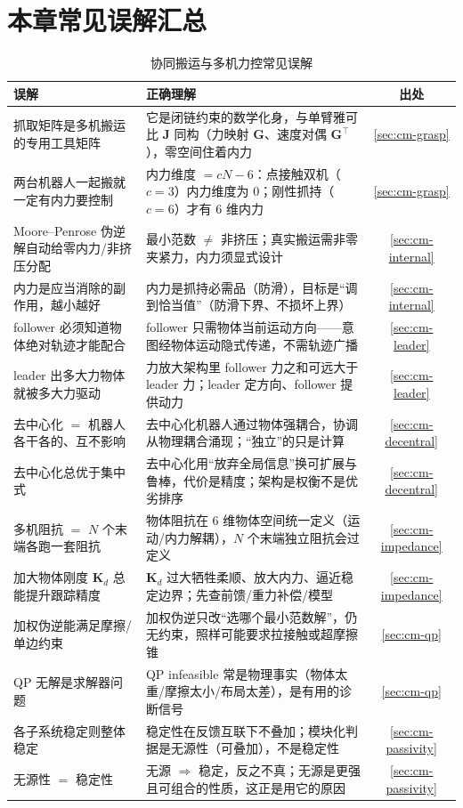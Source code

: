 \section*{本章常见误解汇总}

\begin{table}[H]\centering\small
\caption{协同搬运与多机力控常见误解}
\label{tab:cm-misconceptions}
\begin{tabular}{p{4.6cm}p{6.8cm}c}
\toprule
误解 & 正确理解 & 出处 \\
\midrule
抓取矩阵是多机搬运的专用工具矩阵 & 它是闭链约束的数学化身，与单臂雅可比 $\mathbf{J}$ 同构（力映射 $\mathbf{G}$、速度对偶 $\mathbf{G}^\top$），零空间住着内力 & \cref{sec:cm-grasp} \\
两台机器人一起搬就一定有内力要控制 & 内力维度 $=cN-6$：点接触双机（$c{=}3$）内力维度为 $0$；刚性抓持（$c{=}6$）才有 $6$ 维内力 & \cref{sec:cm-grasp} \\
Moore--Penrose 伪逆解自动给零内力/非挤压分配 & 最小范数 $\ne$ 非挤压；真实搬运需非零夹紧力，内力须显式设计 & \cref{sec:cm-internal} \\
内力是应当消除的副作用，越小越好 & 内力是抓持必需品（防滑），目标是“调到恰当值”（防滑下界、不损坏上界） & \cref{sec:cm-internal} \\
follower 必须知道物体绝对轨迹才能配合 & follower 只需物体当前运动方向——意图经物体运动隐式传递，不需轨迹广播 & \cref{sec:cm-leader} \\
leader 出多大力物体就被多大力驱动 & 力放大架构里 follower 力之和可远大于 leader 力；leader 定方向、follower 提供动力 & \cref{sec:cm-leader} \\
去中心化 $=$ 机器人各干各的、互不影响 & 去中心化机器人通过物体强耦合，协调从物理耦合涌现；“独立”的只是计算 & \cref{sec:cm-decentral} \\
去中心化总优于集中式 & 去中心化用“放弃全局信息”换可扩展与鲁棒，代价是精度；架构是权衡不是优劣排序 & \cref{sec:cm-decentral} \\
多机阻抗 $=$ $N$ 个末端各跑一套阻抗 & 物体阻抗在 $6$ 维物体空间统一定义（运动/内力解耦），$N$ 个末端独立阻抗会过定义 & \cref{sec:cm-impedance} \\
加大物体刚度 $\mathbf{K}_d$ 总能提升跟踪精度 & $\mathbf{K}_d$ 过大牺牲柔顺、放大内力、逼近稳定边界；先查前馈/重力补偿/模型 & \cref{sec:cm-impedance} \\
加权伪逆能满足摩擦/单边约束 & 加权伪逆只改“选哪个最小范数解”，仍无约束，照样可能要求拉接触或超摩擦锥 & \cref{sec:cm-qp} \\
QP 无解是求解器问题 & QP infeasible 常是物理事实（物体太重/摩擦太小/布局太差），是有用的诊断信号 & \cref{sec:cm-qp} \\
各子系统稳定则整体稳定 & 稳定性在反馈互联下不叠加；模块化判据是无源性（可叠加），不是稳定性 & \cref{sec:cm-passivity} \\
无源性 $=$ 稳定性 & 无源 $\Rightarrow$ 稳定，反之不真；无源是更强且可组合的性质，这正是用它的原因 & \cref{sec:cm-passivity} \\
\bottomrule
\end{tabular}
\end{table}

